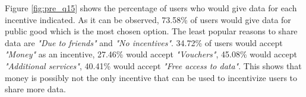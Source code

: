 Figure \ref{fig:pre_q15} shows the percentage of users who would give data for each incentive indicated. As it can be observed, 73.58\% of users would give data for public good which is the most chosen option. The least popular reasons to share data are \textit{"Due to friends"} and \textit{"No incentives"}. 34.72\% of users would accept \textit{"Money"} as an incentive, 27.46\% would accept \textit{"Vouchers"}, 45.08\% would accept \textit{"Additional services"}, 40.41\% would accept \textit{"Free access to data"}. This shows that money is possibly not the only incentive that can be used to incentivize users to share more data.


\begin{figure}[htp]
\hspace{1em}
\newline
{}\hspace{1em}

\end{figure}
